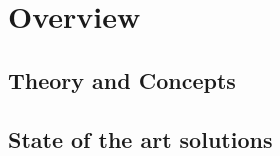 



\section{Overview}

\subsection{Theory and Concepts}

 



\subsection{State of the art solutions} 










 
